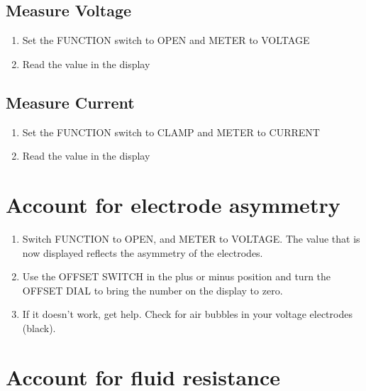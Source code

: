 \documentclass[
]{book}
\begin{document}
\subsection{Measure Voltage}\label{measure-voltage}

\begin{enumerate}
\def\labelenumi{\arabic{enumi}.}
\item
  Set the FUNCTION switch to OPEN and METER to VOLTAGE
\item
  Read the value in the display
\end{enumerate}

\subsection{Measure Current}\label{measure-current}

\begin{enumerate}
\def\labelenumi{\arabic{enumi}.}
\item
  Set the FUNCTION switch to CLAMP and METER to CURRENT
\item
  Read the value in the display
\end{enumerate}

\section{Account for electrode asymmetry}\label{account-for-electrode-asymmetry}

\begin{enumerate}
\def\labelenumi{\arabic{enumi}.}
\item
  Switch FUNCTION to OPEN, and METER to VOLTAGE. The value that is now displayed reflects the asymmetry of the electrodes.
\item
  Use the OFFSET SWITCH in the plus or minus position and turn the OFFSET DIAL to bring the number on the display to zero.
\item
  If it doesn't work, get help. Check for air bubbles in your voltage electrodes (black).
\end{enumerate}

\section{Account for fluid resistance}\label{account-for-fluid-resistance}
\end{document}
